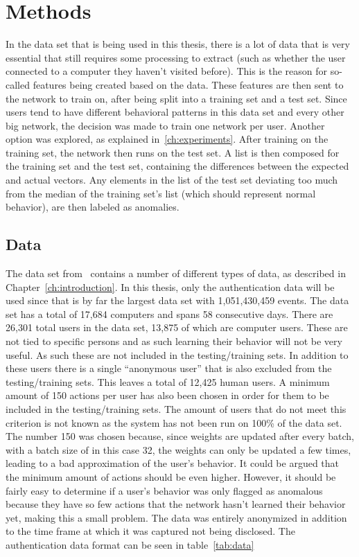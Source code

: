 \chapter{Methods}\label{ch:methods}

In the data set that is being used in this thesis, there is a lot of data that is very essential that still requires some processing to extract (such as whether the user connected to a computer they haven't visited before). This is the reason for so-called features being created based on the data. These features are then sent to the network to train on, after being split into a training set and a test set. Since users tend to have different behavioral patterns in this data set and every other big network, the decision was made to train one network per user. Another option was explored, as explained in~\ref{ch:experiments}. After training on the training set, the network then runs on the test set. A list is then composed for the training set and the test set, containing the differences between the expected and actual vectors. Any elements in the list of the test set deviating too much from the median of the training set's list (which should represent normal behavior), are then labeled as anomalies.

\section{Data}
The data set from~\cite{akent-2015-enterprise-data} contains a number of different types of data, as described in Chapter~\ref{ch:introduction}. In this thesis, only the authentication data will be used since that is by far the largest data set with 1,051,430,459 events. The data set has a total of 17,684 computers and spans 58 consecutive days. There are 26,301 total users in the data set, 13,875 of which are computer users. These are not tied to specific persons and as such learning their behavior will not be very useful. As such these are not included in the testing/training sets. In addition to these users there is a single \enquote{anonymous user} that is also excluded from the testing/training sets. This leaves a total of 12,425 human users. A minimum amount of 150 actions per user has also been chosen in order for them to be included in the testing/training sets. The amount of users that do not meet this criterion is not known as the system has not been run on 100\% of the data set. The number 150 was chosen because, since weights are updated after every batch, with a batch size of in this case 32, the weights can only be updated a few times, leading to a bad approximation of the user's behavior. It could be argued that the minimum amount of actions should be even higher. However, it should be fairly easy to determine if a user's behavior was only flagged as anomalous because they have so few actions that the network hasn't learned their behavior yet, making this a small problem. The data was entirely anonymized in addition to the time frame at which it was captured not being disclosed. The authentication data format can be seen in table~\ref{tab:data}

